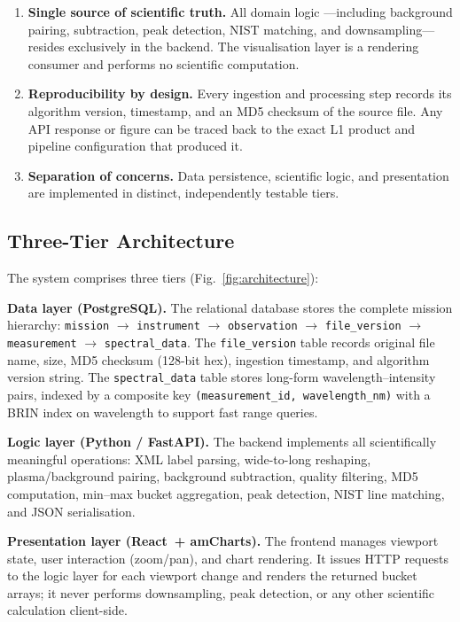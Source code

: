 \documentclass[a4paper,twocolumn,10pt]{article}
\begin{document}
\begin{enumerate}[nosep,leftmargin=*]
  \item \textbf{Single source of scientific truth.}  All domain logic
    ---including background pairing, subtraction, peak detection,
    NIST matching, and downsampling---resides exclusively in the
    backend.  The visualisation layer is a rendering consumer and
    performs no scientific computation.

  \item \textbf{Reproducibility by design.}  Every ingestion and
    processing step records its algorithm version, timestamp, and an
    MD5 checksum of the source file.  Any API response or figure can
    be traced back to the exact L1 product and pipeline configuration
    that produced it.

  \item \textbf{Separation of concerns.}  Data persistence, scientific
    logic, and presentation are implemented in distinct, independently
    testable tiers.
\end{enumerate}

\subsection{Three-Tier Architecture}

The system comprises three tiers (Fig.~\ref{fig:architecture}):

\textbf{Data layer (PostgreSQL).}  The relational database stores the
complete mission hierarchy:
\texttt{mission} $\rightarrow$ \texttt{instrument} $\rightarrow$
\texttt{observation} $\rightarrow$ \texttt{file\_version} $\rightarrow$
\texttt{measurement} $\rightarrow$ \texttt{spectral\_data}.
The \texttt{file\_version} table records original file name, size,
MD5 checksum (128-bit hex), ingestion timestamp, and algorithm version
string.  The \texttt{spectral\_data} table stores long-form
wavelength--intensity pairs, indexed by a composite key
\texttt{(measurement\_id, wavelength\_nm)} with a BRIN index on
wavelength to support fast range queries.

\textbf{Logic layer (Python / FastAPI).}  The backend implements all
scientifically meaningful operations: XML label parsing, wide-to-long
reshaping, plasma/background pairing, background subtraction, quality
filtering, MD5 computation, min--max bucket aggregation, peak
detection, NIST line matching, and JSON serialisation.

\textbf{Presentation layer (React~+ amCharts).}  The frontend manages
viewport state, user interaction (zoom/pan), and chart rendering.
It issues HTTP requests to the logic layer for each viewport change and
renders the returned bucket arrays; it never performs downsampling,
peak detection, or any other scientific calculation client-side.
\end{document}
